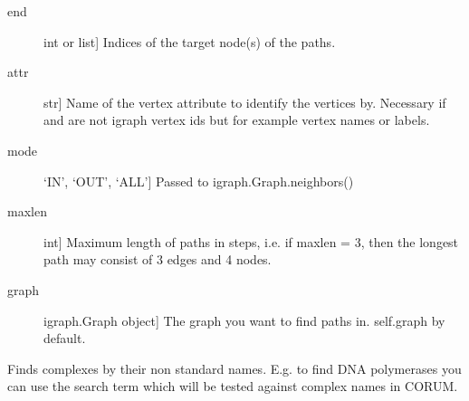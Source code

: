 \documentclass[letterpaper,10pt,english]{sphinxmanual}
\begin{document}
\begin{fulllineitems}
\begin{fulllineitems}
\begin{description}
\item[{end}] \leavevmode{[}int or list{]}
Indices of the target node(s) of the paths.

\item[{attr}] \leavevmode{[}str{]}
Name of the vertex attribute to identify the vertices by.
Necessary if  and  are not igraph vertex ids
but for example vertex names or labels.

\item[{mode}] \leavevmode{[}‘IN’, ‘OUT’, ‘ALL’{]}
Passed to igraph.Graph.neighbors()

\item[{maxlen}] \leavevmode{[}int{]}
Maximum length of paths in steps, i.e. if maxlen = 3, then
the longest path may consist of 3 edges and 4 nodes.

\item[{graph}] \leavevmode{[}igraph.Graph object{]}
The graph you want to find paths in. self.graph by default.

\end{description}

\end{fulllineitems}


\begin{fulllineitems}
\label{\detokenize{reference:pypath.main.PyPath.find_all_paths2}}
\end{fulllineitems}


\begin{fulllineitems}
\label{\detokenize{reference:pypath.main.PyPath.find_complex}}
Finds complexes by their non standard names.
E.g. to find DNA polymerases you can use the search
term  which will be tested against complex names
in CORUM.

\end{fulllineitems}



\end{fulllineitems}
\end{document}
